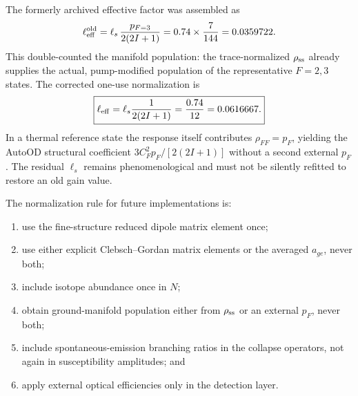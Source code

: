 \documentclass[11pt,a4paper]{article}
\begin{document}
The formerly archived effective factor was assembled as
\begin{equation}
\ell_{\rm eff}^{\rm old}
=\ell_s\,\frac{p_{F=3}}{2(2I+1)}
=0.74\times\frac{7}{144}
=0.0359722 .
\label{eq:ell-effective}
\end{equation}
This double-counted the manifold population: the trace-normalized
$\rho_{\rm ss}$ already supplies the actual, pump-modified population of the
representative $F=2,3$ states. The corrected one-use normalization is
\begin{equation}
\boxed{\ell_{\rm eff}=\ell_s\frac{1}{2(2I+1)}
=\frac{0.74}{12}=0.0616667 .}
\label{eq:ell-effective-corrected}
\end{equation}
In a thermal reference state the response itself contributes
$\rho_{FF}=p_F$, yielding the AutoOD structural coefficient
$3C_F^2p_F/[2(2I+1)]$ without a second external $p_F$. The residual $\ell_s$
remains phenomenological and must not be silently refitted to restore an old
gain value.

The normalization rule for future implementations is:
\begin{enumerate}
\item use the fine-structure reduced dipole matrix element once;
\item use either explicit Clebsch--Gordan matrix elements or the averaged
$a_{ge}$, never both;
\item include isotope abundance once in $N$;
\item obtain ground-manifold population either from $\rho_{\rm ss}$ or an
external $p_F$, never both;
\item include spontaneous-emission branching ratios in the collapse
operators, not again in susceptibility amplitudes; and
\item apply external optical efficiencies only in the detection layer.
\end{enumerate}
\end{document}
